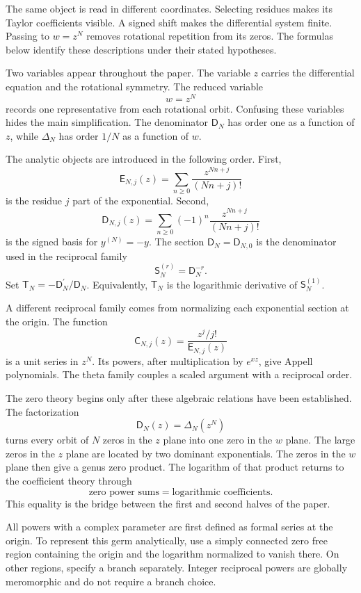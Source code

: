 \documentclass[11pt,letterpaper]{article}
\theoremstyle{definition}
\theoremstyle{remark}
\newcommand{\Dfun}{\mathsf D}
\newcommand{\Efun}{\mathsf E}
\newcommand{\Sfun}{\mathsf S}
\newcommand{\Tfun}{\mathsf T}
\newcommand{\Cfun}{\mathsf C}
\begin{document}
\begin{keyidea}
The same object is read in different coordinates. Selecting residues makes its Taylor coefficients visible. A signed shift makes the differential system finite. Passing to $w=z^N$ removes rotational repetition from its zeros. The formulas below identify these descriptions under their stated hypotheses.
\end{keyidea}

Two variables appear throughout the paper.  The variable $z$ carries the differential equation and the rotational symmetry.  The reduced variable
\[
w=z^N
\]
records one representative from each rotational orbit.  Confusing these variables hides the main simplification.  The denominator $\Dfun_N$ has order one as a function of $z$, while $\Delta_N$ has order $1/N$ as a function of $w$.

The analytic objects are introduced in the following order.  First,
\[
\Efun_{N,j}(z)
=
\sum_{n\geq0}\frac{z^{Nn+j}}{(Nn+j)!}
\]
is the residue $j$ part of the exponential.  Second,
\[
\Dfun_{N,j}(z)
=
\sum_{n\geq0}(-1)^n\frac{z^{Nn+j}}{(Nn+j)!}
\]
is the signed basis for $y^{(N)}=-y$.  The section $\Dfun_N=\Dfun_{N,0}$ is the denominator used in the reciprocal family
\[
\Sfun_N^{(r)}=\Dfun_N^{-r}.
\]
Set $\Tfun_N=-\Dfun_N^{\prime}/\Dfun_N$. Equivalently, $\Tfun_N$ is the logarithmic derivative of $\Sfun_N^{(1)}$.

A different reciprocal family comes from normalizing each exponential section at the origin.  The function
\[
\Cfun_{N,j}(z)
=
\frac{z^j/j!}{\Efun_{N,j}(z)}
\]
is a unit series in $z^N$.  Its powers, after multiplication by $e^{xz}$, give Appell polynomials.  The theta family couples a scaled argument with a reciprocal order.

The zero theory begins only after these algebraic relations have been established.  The factorization
\[
\Dfun_N(z)=\Delta_N(z^N)
\]
turns every orbit of $N$ zeros in the $z$ plane into one zero in the $w$ plane.  The large zeros in the $z$ plane are located by two dominant exponentials.  The zeros in the $w$ plane then give a genus zero product.  The logarithm of that product returns to the coefficient theory through
\[
\text{zero power sums}
=
\text{logarithmic coefficients}.
\]
This equality is the bridge between the first and second halves of the paper.

All powers with a complex parameter are first defined as formal series at the origin.  To represent this germ analytically, use a simply connected zero free region containing the origin and the logarithm normalized to vanish there.  On other regions, specify a branch separately.  Integer reciprocal powers are globally meromorphic and do not require a branch choice.
\end{document}
